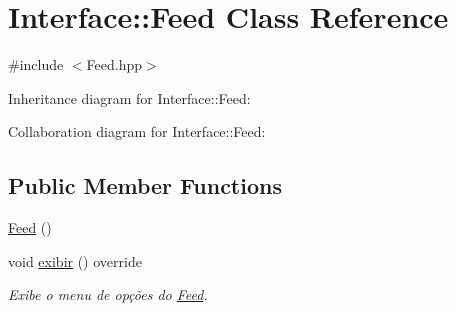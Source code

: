 \hypertarget{class_interface_1_1_feed}{}\section{Interface\+:\+:Feed Class Reference}
\label{class_interface_1_1_feed}


{\ttfamily \#include $<$Feed.\+hpp$>$}



Inheritance diagram for Interface\+:\+:Feed\+:


Collaboration diagram for Interface\+:\+:Feed\+:
\subsection*{Public Member Functions}
\begin{DoxyCompactItemize}
\item 
\hyperlink{class_interface_1_1_feed_a03aed37bb58912363b04bb319d16d8b8}{Feed} ()
\item 
void \hyperlink{class_interface_1_1_feed_a8ba454c1afcb942a84bfd9d918cf262c}{exibir} () override
\begin{DoxyCompactList}\small\item\em Exibe o menu de opções do \hyperlink{class_interface_1_1_feed}{Feed}. \end{DoxyCompactList}\end{DoxyCompactItemize}
